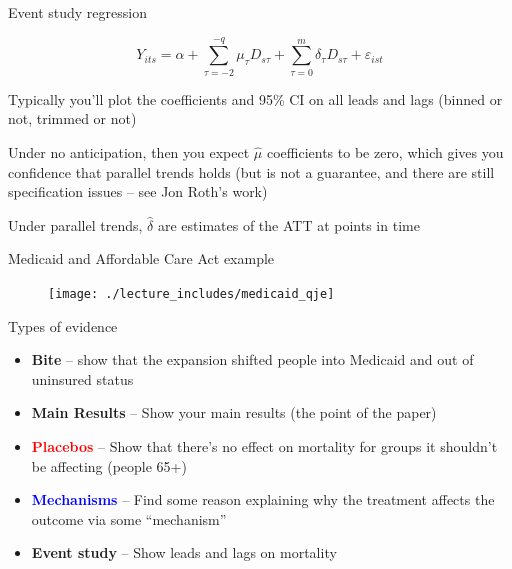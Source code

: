 \documentclass{beamer}
\begin{document}
\begin{frame}{Event study regression}


$$Y_{its} = \alpha + \sum_{\tau=-2}^{-q}\mu_{\tau}D_{s\tau} + \sum_{\tau=0}^m\delta_{\tau}D_{s\tau}+\varepsilon_{ist}$$

\bigskip

Typically you'll plot the coefficients and 95\% CI on all leads and lags (binned or not, trimmed or not) 

\bigskip

Under no anticipation, then you expect $\widehat{\mu}$ coefficients to be zero, which gives you confidence that parallel trends holds (but is not a guarantee, and there are still specification issues -- see Jon Roth's work)

\bigskip

Under parallel trends, $\widehat{\delta}$ are estimates of the ATT at points in time

\end{frame}



\begin{frame}{Medicaid and Affordable Care Act example}

\begin{figure}
\texttt{[image: ./lecture\_includes/medicaid\_qje]}
\end{figure}

\end{frame}

\begin{frame}{Types of evidence}

\begin{itemize}
\item \textbf{Bite} -- show that the expansion shifted people into Medicaid and out of uninsured status
\item \textbf{Main Results} -- Show your main results (the point of the paper)
\item \textcolor{red}{\textbf{Placebos}} -- Show that there's no effect on mortality for groups it shouldn't be affecting (people 65+)
\item \textcolor{blue}{\textbf{Mechanisms}} -- Find some reason explaining why the treatment affects the outcome via some ``mechanism''
\item \textbf{Event study} -- Show leads and lags on mortality
\end{itemize}

\end{frame}
\end{document}

